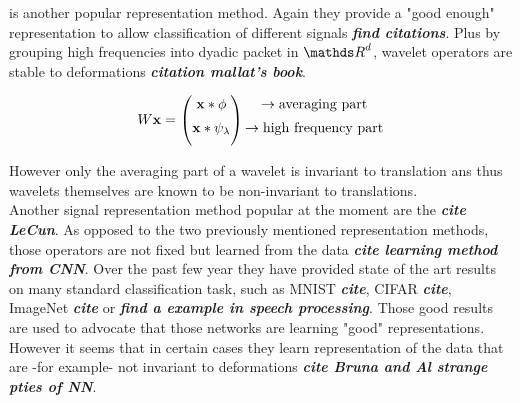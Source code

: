 \documentclass[a4paper,11pt]{report}
\begin{document}
			 is another popular representation method. Again they provide a "good enough" representation to allow classification of different signals \textbf{\textit{find citations}}. Plus by grouping high frequencies into dyadic packet in $\dsR^{d}$, wavelet operators are stable to deformations \textbf{\textit{citation mallat's book}}. 
			
			
			\begin{equation}
				\begin{matrix}
					W{\bf x} =
					\begin{pmatrix}
						{\bf x} \ast \phi \\[0.5em]
						{\bf x} \ast \psi_{\lambda} \\[0.5em]
					\end{pmatrix}
					\begin{aligned}
						\begin{matrix}
							\rightarrow \text{averaging part}				\\[0.5em]
							\rightarrow \text{high frequency part}	\\[0.5em]
						\end{matrix}
					\end{aligned}
				\end{matrix}
			\end{equation}
		

			However only the averaging part of a wavelet is invariant to translation ans thus wavelets themselves are known to be non-invariant to translations.\\
			
			Another signal representation method popular at the moment are the  \textbf{\textit{cite LeCun}}. As opposed to the two previously mentioned representation methods, those operators are not fixed but learned from the data \textbf{\textit{cite learning method from CNN}}. Over the past few year they have provided state of the art results on many standard classification task, such as MNIST \textbf{\textit{cite}}, CIFAR \textbf{\textit{cite}}, ImageNet \textbf{\textit{cite }} or \textbf{\textit{find a example in speech processing}}. Those good results are used to advocate that those networks are learning "good" representations. However it seems that in certain cases they learn representation of the data that are -for example- not invariant to deformations \textbf{\textit{cite Bruna and Al strange pties of NN}}.\\
			         
\end{document}
